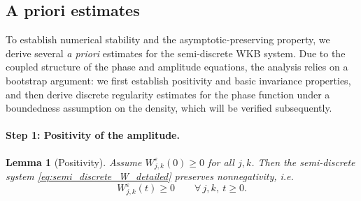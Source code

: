 \documentclass[11pt, dina4, amsfont12]{article}
\newtheorem{lemma}{Lemma}[section]
\begin{document}

\subsection{A priori estimates}

To establish numerical stability and the asymptotic-preserving property, we
derive several \emph{a priori} estimates for the semi-discrete WKB system.
Due to the coupled structure of the phase and amplitude equations, the analysis
relies on a bootstrap argument: we first establish positivity and basic
invariance properties, and then derive discrete regularity estimates for the
phase function under a boundedness assumption on the density, which will be
verified subsequently.

\medskip

\paragraph{Step 1: Positivity of the amplitude.}

\begin{lemma}[Positivity]\label{lem:positivity_W}
Assume $W_{j,k}^\varepsilon(0)\ge0$ for all $j,k$. Then the semi-discrete system
\eqref{eq:semi_discrete_W_detailed} preserves nonnegativity, i.e.
\[
W_{j,k}^\varepsilon(t)\ge0
\qquad
\forall\, j,k,\ t\ge0 .
\]
\end{lemma}
\end{document}
